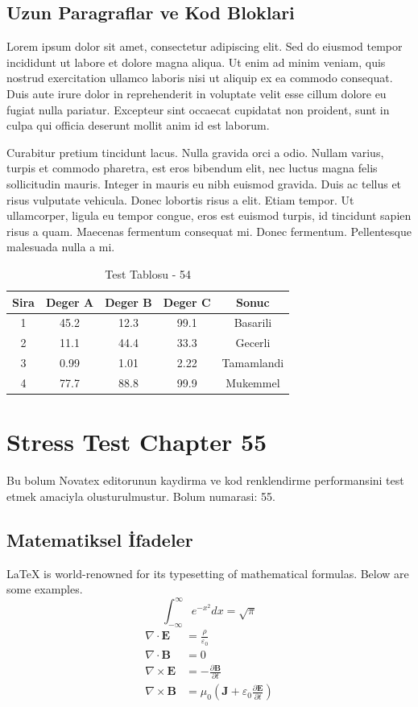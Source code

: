 \documentclass[12pt,a4paper]{article}
\begin{document}
\subsection{Uzun Paragraflar ve Kod Bloklari}
Lorem ipsum dolor sit amet, consectetur adipiscing elit. Sed do eiusmod tempor incididunt ut labore et dolore magna aliqua. Ut enim ad minim veniam, quis nostrud exercitation ullamco laboris nisi ut aliquip ex ea commodo consequat. Duis aute irure dolor in reprehenderit in voluptate velit esse cillum dolore eu fugiat nulla pariatur. Excepteur sint occaecat cupidatat non proident, sunt in culpa qui officia deserunt mollit anim id est laborum.

Curabitur pretium tincidunt lacus. Nulla gravida orci a odio. Nullam varius, turpis et commodo pharetra, est eros bibendum elit, nec luctus magna felis sollicitudin mauris. Integer in mauris eu nibh euismod gravida. Duis ac tellus et risus vulputate vehicula. Donec lobortis risus a elit. Etiam tempor. Ut ullamcorper, ligula eu tempor congue, eros est euismod turpis, id tincidunt sapien risus a quam. Maecenas fermentum consequat mi. Donec fermentum. Pellentesque malesuada nulla a mi.

\begin{table}[h!]
\centering
\begin{tabular}{|c|c|c|c|c|}
\hline
\textbf{Sira} & \textbf{Deger A} & \textbf{Deger B} & \textbf{Deger C} & \textbf{Sonuc} \\
\hline
1 & 45.2 & 12.3 & 99.1 & Basarili \\
2 & 11.1 & 44.4 & 33.3 & Gecerli \\
3 & 0.99 & 1.01 & 2.22 & Tamamlandi \\
4 & 77.7 & 88.8 & 99.9 & Mukemmel \\
\hline
\end{tabular}
\caption{Test Tablosu - 54}
\end{table}

\newpage
\section{Stress Test Chapter 55}
Bu bolum Novatex editorunun kaydirma ve kod renklendirme performansini test etmek amaciyla olusturulmustur. Bolum numarasi: 55.

\subsection{Matematiksel İfadeler}
\LaTeX{} is world-renowned for its typesetting of mathematical formulas. Below are some examples.
\begin{equation}
\int_{-\infty}^{\infty} e^{-x^2} dx = \sqrt{\pi}
\end{equation}
\begin{align}
\nabla \cdot \mathbf{E} &= \frac{\rho}{\varepsilon_0} \\
\nabla \cdot \mathbf{B} &= 0 \\
\nabla \times \mathbf{E} &= -\frac{\partial \mathbf{B}}{\partial t} \\
\nabla \times \mathbf{B} &= \mu_0\left(\mathbf{J} + \varepsilon_0 \frac{\partial \mathbf{E}}{\partial t}\right)
\end{align}
\end{document}
